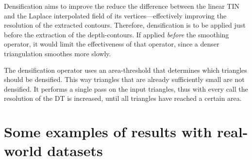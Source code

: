 %

Densification aims to improve the reduce the difference between the linear TIN and the Laplace interpolated field of its vertices---effectively improving the resolution of the extracted contours.
Therefore, densification is to be applied just before the extraction of the depth-contours.
If applied \emph{before} the smoothing operator, it would limit the effectiveness of that operator, since a denser triangulation smoothes more slowly.

The densification operator uses an area-threshold that determines which triangles should be densified. 
This way triangles that are already sufficiently small are not densified. 
It performs a single pass on the input triangles, thus with every call the resolution of the DT is increased, until all triangles have reached a certain area.



%
\section{Some examples of results with real-world datasets}



